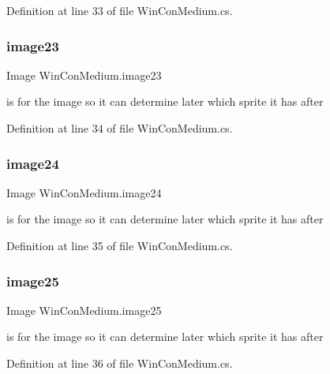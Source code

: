 Definition at line 33 of file Win\+Con\+Medium.\+cs.

\mbox{\label{class_win_con_medium_adf305047a02e55954b1a8448293d51e2}} 
\subsubsection{\texorpdfstring{image23}{image23}}
{\footnotesize\ttfamily Image Win\+Con\+Medium.\+image23}

is for the image so it can determine later which sprite it has after 

Definition at line 34 of file Win\+Con\+Medium.\+cs.

\mbox{\label{class_win_con_medium_a4425ad766a840cb323156f865145910a}} 
\subsubsection{\texorpdfstring{image24}{image24}}
{\footnotesize\ttfamily Image Win\+Con\+Medium.\+image24}

is for the image so it can determine later which sprite it has after 

Definition at line 35 of file Win\+Con\+Medium.\+cs.

\mbox{\label{class_win_con_medium_a8c43f4613a6b0d719e50c6ee2e6bc58e}} 
\subsubsection{\texorpdfstring{image25}{image25}}
{\footnotesize\ttfamily Image Win\+Con\+Medium.\+image25}

is for the image so it can determine later which sprite it has after 

Definition at line 36 of file Win\+Con\+Medium.\+cs.

\mbox{\label{class_win_con_medium_acd46bfc294703aacc480f38e73d5a9b5}} 
